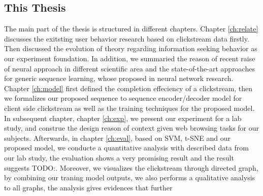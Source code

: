 \subsection{This Thesis}



The main part of the thesis is structured in different chapters.
Chapter \ref{ch:relate} discusses the exitsting user behavior research based on clickstream data firstly. Then discussed the evolution of theory regarding information seeking behavior as our experiment foundation.
In addition, we summaried the reason of recent raise of neural approach in different scientific 
area and the state-of-the-art approaches for generic sequence learning, whose proposed in neural network research.
Chapter \ref{ch:model} first defined the completion effeciency of a clickstream, then we
formalizes our proposed sequence to sequence encoder/decoder model for client side
clickstream as well as the training techniques for the proposed model.
In subsequent chapter, chapter \ref{ch:exp}, we present our experiment for a lab study,
and construe the design reason of context given web browsing tasks for our subjects.
Afterwards, in chapter \ref{ch:eval}, based on SVM, t-SNE and our proposed model, 
we conducte a quantitative analysis with described data from our lab study, 
the evaluation shows a very promising result and the result suggests TODO:. %
Moreover, we visualizes the clickstream through directed graph, by combining our traning model outputs,
we also performs a qualitative analysis to all graphs, the analysis gives evidences that further 
